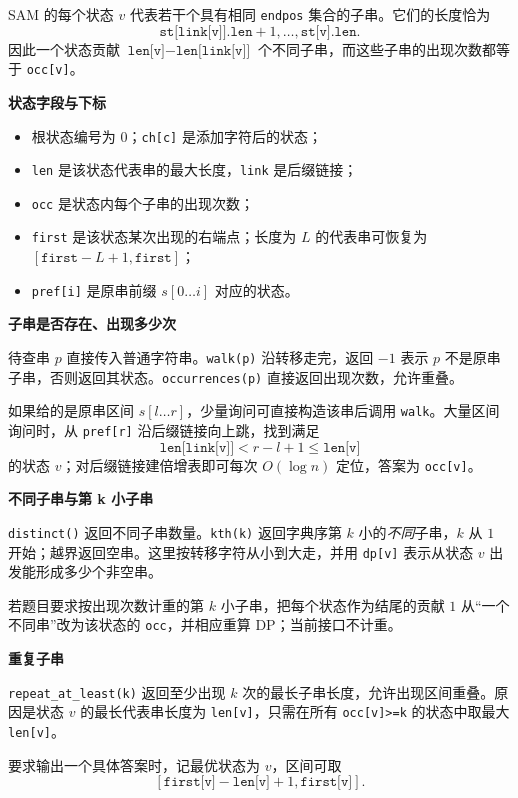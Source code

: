 SAM 的每个状态 $v$ 代表若干个具有相同 \texttt{endpos} 集合的子串。它们的长度恰为
\[
  \texttt{st[link[v]].len}+1,
  \ldots,
  \texttt{st[v].len}.
\]
因此一个状态贡献 $\texttt{len[v]}-\texttt{len[link[v]]}$ 个不同子串，而这些子串的出现次数都等于 \texttt{occ[v]}。

\textbf{状态字段与下标}

\begin{itemize}
  \item 根状态编号为 $0$；\texttt{ch[c]} 是添加字符后的状态；
  \item \texttt{len} 是该状态代表串的最大长度，\texttt{link} 是后缀链接；
  \item \texttt{occ} 是状态内每个子串的出现次数；
  \item \texttt{first} 是该状态某次出现的右端点；长度为 $L$ 的代表串可恢复为 $[\texttt{first}-L+1,\texttt{first}]$；
  \item \texttt{pref[i]} 是原串前缀 $s[0\ldots i]$ 对应的状态。
\end{itemize}

\textbf{子串是否存在、出现多少次}

待查串 $p$ 直接传入普通字符串。\texttt{walk(p)} 沿转移走完，返回 $-1$ 表示 $p$ 不是原串子串，否则返回其状态。\texttt{occurrences(p)} 直接返回出现次数，允许重叠。

如果给的是原串区间 $s[l\ldots r]$，少量询问可直接构造该串后调用 \texttt{walk}。大量区间询问时，从 \texttt{pref[r]} 沿后缀链接向上跳，找到满足
\[
  \texttt{len[link[v]]}<r-l+1\le\texttt{len[v]}
\]
的状态 $v$；对后缀链接建倍增表即可每次 $O(\log n)$ 定位，答案为 \texttt{occ[v]}。

\textbf{不同子串与第 k 小子串}

\texttt{distinct()} 返回不同子串数量。\texttt{kth(k)} 返回字典序第 $k$ 小的\emph{不同}子串，$k$ 从 $1$ 开始；越界返回空串。这里按转移字符从小到大走，并用 \texttt{dp[v]} 表示从状态 $v$ 出发能形成多少个非空串。

若题目要求按出现次数计重的第 $k$ 小子串，把每个状态作为结尾的贡献 $1$ 从“一个不同串”改为该状态的 \texttt{occ}，并相应重算 DP；当前接口不计重。

\textbf{重复子串}

\texttt{repeat\_at\_least(k)} 返回至少出现 $k$ 次的最长子串长度，允许出现区间重叠。原因是状态 $v$ 的最长代表串长度为 \texttt{len[v]}，只需在所有 \texttt{occ[v]>=k} 的状态中取最大 \texttt{len[v]}。

要求输出一个具体答案时，记最优状态为 $v$，区间可取
\[
  [\texttt{first[v]}-\texttt{len[v]}+1,\texttt{first[v]}].
\]

